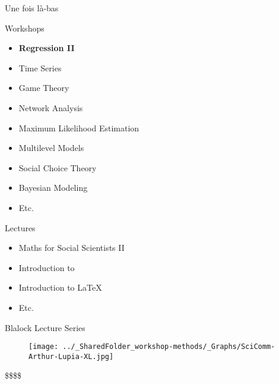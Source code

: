 \documentclass{beamer}
\begin{document}
\begin{frame}
     \begin{center}
          \Huge Une fois là-bas 
      \end{center}
\end{frame}


\begin{frame}{Workshops}
  \begin{itemize}
    \item \textbf{Regression II}
    \item Time Series
    \item Game Theory 
    \item Network Analysis
    \item Maximum Likelihood Estimation
    \item Multilevel Models 
    \item Social Choice Theory
    \item Bayesian Modeling 
    \item Etc. 
  \end{itemize}
\end{frame}

\begin{frame}{Lectures}
\begin{itemize}
    \item Maths for Social Scientists II
    \item Introduction to \R 
    \item Introduction to \LaTeX 
    \item Etc. 
  \end{itemize}
\end{frame}


\begin{frame}{Blalock Lecture Series}

\begin{figure}
    \centering
    \texttt{[image: ../\_SharedFolder\_workshop-methods/\_Graphs/SciComm-Arthur-Lupia-XL.jpg]}
    \label{fig:my_label3}
\end{figure}
\end{frame}

\begin{frame}
     \begin{center}
          \Huge \$\$\$\$
      \end{center}
\end{frame}
\end{document}
